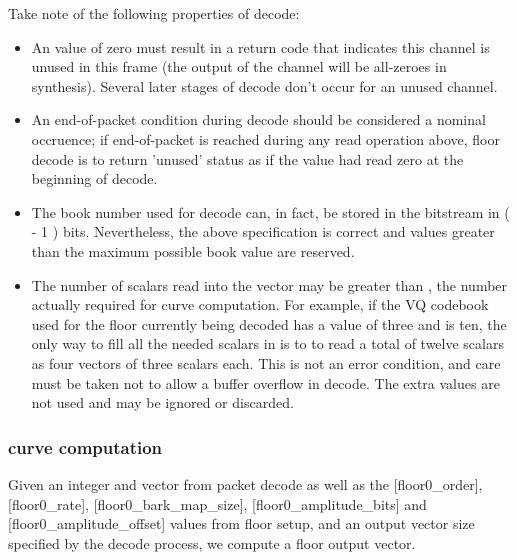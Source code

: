Take note of the following properties of decode:
\begin{itemize}
 \item An \varname{[amplitude]} value of zero must result in a return code that indicates this channel is unused in this frame (the output of the channel will be all-zeroes in synthesis).  Several later stages of decode don't occur for an unused channel.
 \item An end-of-packet condition during decode should be considered a
nominal occruence; if end-of-packet is reached during any read
operation above, floor decode is to return 'unused' status as if the
\varname{[amplitude]} value had read zero at the beginning of decode.

 \item The book number used for decode
can, in fact, be stored in the bitstream in (  -
1 ) bits.  Nevertheless, the above specification is correct and values
greater than the maximum possible book value are reserved.

 \item The number of scalars read into the vector \varname{[coefficients]}
may be greater than , the number actually
required for curve computation.  For example, if the VQ codebook used
for the floor currently being decoded has a
 value of three and
 is ten, the only way to fill all the needed
scalars in \varname{[coefficients]} is to to read a total of twelve
scalars as four vectors of three scalars each.  This is not an error
condition, and care must be taken not to allow a buffer overflow in
decode. The extra values are not used and may be ignored or discarded.
\end{itemize}




\subsubsection{curve computation} \label{vorbis:spec:floor0-synth}

Given an \varname{[amplitude]} integer and \varname{[coefficients]}
vector from packet decode as well as the [floor0\_order],
[floor0\_rate], [floor0\_bark\_map\_size], [floor0\_amplitude\_bits] and
[floor0\_amplitude\_offset] values from floor setup, and an output
vector size \varname{[n]} specified by the decode process, we compute a
floor output vector.

